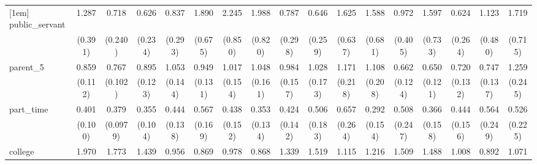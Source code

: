 {\begin{tabular}{l*{16}{c}}
[1em]
public\_servant      &       1.287         &       0.718         &       0.626         &       0.837         &       1.890         &       2.245\sym{*}  &       1.988         &       0.787         &       0.646         &       1.625         &       1.588         &       0.972         &       1.597         &       0.624         &       1.123         &       1.719         \\
                    &     (0.391)         &     (0.240)         &     (0.234)         &     (0.293)         &     (0.675)         &     (0.850)         &     (0.820)         &     (0.298)         &     (0.259)         &     (0.637)         &     (0.681)         &     (0.405)         &     (0.733)         &     (0.264)         &     (0.480)         &     (0.715)         \\
[1em]
parent\_5            &       0.859         &       0.767\sym{*}  &       0.895         &       1.053         &       0.949         &       1.017         &       1.048         &       0.984         &       1.028         &       1.171         &       1.108         &       0.662\sym{*}  &       0.650\sym{*}  &       0.720         &       0.747         &       1.259         \\
                    &     (0.112)         &     (0.102)         &     (0.123)         &     (0.144)         &     (0.131)         &     (0.154)         &     (0.161)         &     (0.157)         &     (0.173)         &     (0.218)         &     (0.208)         &     (0.124)         &     (0.121)         &     (0.132)         &     (0.137)         &     (0.245)         \\
[1em]
part\_time           &       0.401\sym{***}&       0.379\sym{***}&       0.355\sym{***}&       0.444\sym{**} &       0.567         &       0.438\sym{*}  &       0.353\sym{**} &       0.424\sym{*}  &       0.506         &       0.657         &       0.292\sym{*}  &       0.508         &       0.366\sym{*}  &       0.444\sym{*}  &       0.564         &       0.526         \\
                    &     (0.100)         &    (0.0979)         &     (0.104)         &     (0.138)         &     (0.169)         &     (0.152)         &     (0.134)         &     (0.142)         &     (0.183)         &     (0.264)         &     (0.154)         &     (0.247)         &     (0.158)         &     (0.156)         &     (0.249)         &     (0.225)         \\
[1em]
college             &       1.970\sym{***}&       1.773\sym{**} &       1.439         &       0.956         &       0.869         &       0.978         &       0.868         &       1.339         &       1.519         &       1.115         &       1.216         &       1.509         &       1.488         &       1.008         &       0.892         &       1.071         \\

\end{tabular}}

